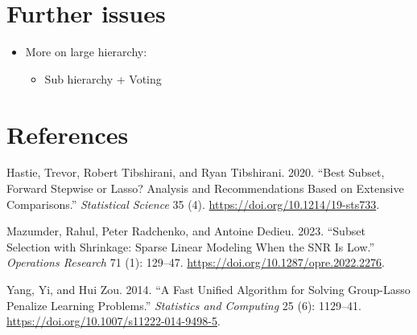 \documentclass[
  letterpaper,
  DIV=11,
  numbers=noendperiod]{scrartcl}
\providecommand{\tightlist}{%
  \setlength{\itemsep}{0pt}\setlength{\parskip}{0pt}}\usepackage{longtable,booktabs,array}
\newlength{\cslhangindent}
\newlength{\cslentryspacingunit} %
\newenvironment{CSLReferences}[2] %
 {%
  \setlength{\parindent}{0pt}
  \ifodd #1
  \let\oldpar\par
  \def\par{\hangindent=\cslhangindent\oldpar}
  \fi
  \setlength{\parskip}{#2\cslentryspacingunit}
 }%
 {}
\begin{document}
\hypertarget{further-issues}{%
\section{Further issues}\label{further-issues}}

\begin{itemize}
\tightlist
\item
  More on large hierarchy:

  \begin{itemize}
  \tightlist
  \item
    Sub hierarchy + Voting
  \end{itemize}
\end{itemize}

\hypertarget{references}{%
\section{References}\label{references}}

\hypertarget{refs}{}
\begin{CSLReferences}{1}{0}
\leavevmode{}%
Hastie, Trevor, Robert Tibshirani, and Ryan Tibshirani. 2020. {``Best
Subset, Forward Stepwise or Lasso? Analysis and Recommendations Based on
Extensive Comparisons.''} \emph{Statistical Science} 35 (4).
\url{https://doi.org/10.1214/19-sts733}.

\leavevmode{}%
Mazumder, Rahul, Peter Radchenko, and Antoine Dedieu. 2023. {``Subset
Selection with Shrinkage: Sparse Linear Modeling When the SNR Is Low.''}
\emph{Operations Research} 71 (1): 129--47.
\url{https://doi.org/10.1287/opre.2022.2276}.

\leavevmode{}%
Yang, Yi, and Hui Zou. 2014. {``A Fast Unified Algorithm for Solving
Group-Lasso Penalize Learning Problems.''} \emph{Statistics and
Computing} 25 (6): 1129--41.
\url{https://doi.org/10.1007/s11222-014-9498-5}.

\end{CSLReferences}
\end{document}
